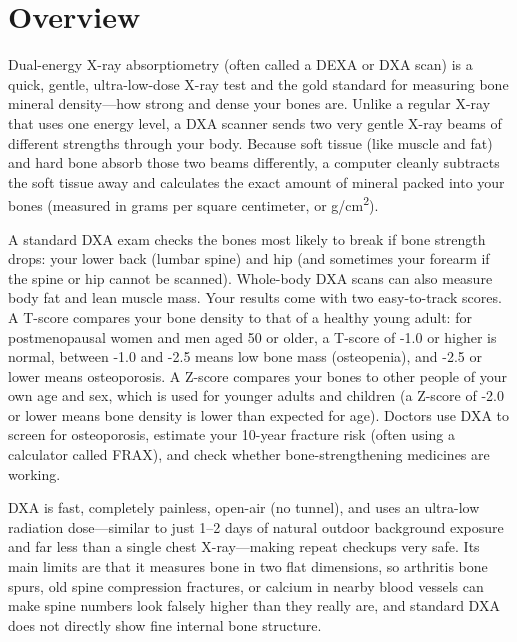 \label{ch:infographic-dexa}

\section{Overview}

Dual-energy X-ray absorptiometry (often called a DEXA or DXA scan) is a quick, gentle, ultra-low-dose X-ray test and the gold standard for measuring bone mineral density---how strong and dense your bones are. Unlike a regular X-ray that uses one energy level, a DXA scanner sends two very gentle X-ray beams of different strengths through your body. Because soft tissue (like muscle and fat) and hard bone absorb those two beams differently, a computer cleanly subtracts the soft tissue away and calculates the exact amount of mineral packed into your bones (measured in grams per square centimeter, or g/cm\textsuperscript{2}).

A standard DXA exam checks the bones most likely to break if bone strength drops: your lower back (lumbar spine) and hip (and sometimes your forearm if the spine or hip cannot be scanned). Whole-body DXA scans can also measure body fat and lean muscle mass. Your results come with two easy-to-track scores. A T-score compares your bone density to that of a healthy young adult: for postmenopausal women and men aged 50 or older, a T-score of -1.0 or higher is normal, between -1.0 and -2.5 means low bone mass (osteopenia), and -2.5 or lower means osteoporosis. A Z-score compares your bones to other people of your own age and sex, which is used for younger adults and children (a Z-score of -2.0 or lower means bone density is lower than expected for age). Doctors use DXA to screen for osteoporosis, estimate your 10-year fracture risk (often using a calculator called FRAX), and check whether bone-strengthening medicines are working.

DXA is fast, completely painless, open-air (no tunnel), and uses an ultra-low radiation dose---similar to just 1--2 days of natural outdoor background exposure and far less than a single chest X-ray---making repeat checkups very safe. Its main limits are that it measures bone in two flat dimensions, so arthritis bone spurs, old spine compression fractures, or calcium in nearby blood vessels can make spine numbers look falsely higher than they really are, and standard DXA does not directly show fine internal bone structure.

